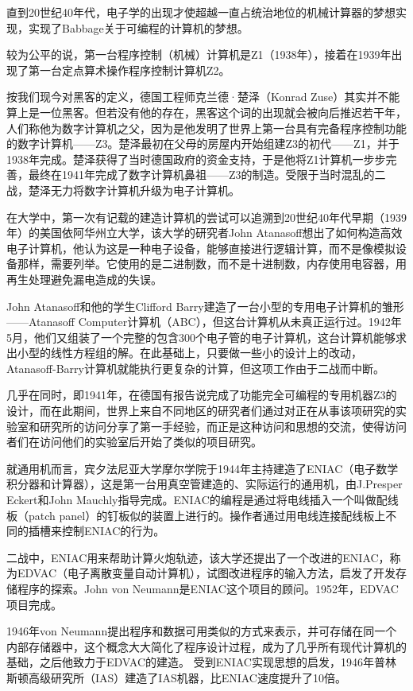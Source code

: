 直到20世纪40年代，电子学的出现才使超越一直占统治地位的机械计算器的梦想实现，实现了Babbage关于可编程的计算机的梦想。

较为公平的说，第一台程序控制（机械）计算机是Z1（1938年），接着在1939年出现了第一台定点算术操作程序控制计算机Z2。

按我们现今对黑客的定义，德国工程师克兰德·楚泽（Konrad Zuse）其实并不能算上是一位黑客。但若没有他的存在，黑客这个词的出现就会被向后推迟若干年，人们称他为数字计算机之父，因为是他发明了世界上第一台具有完备程序控制功能的数字计算机——Z3。楚泽最初在父母的房屋内开始组建Z3的初代——Z1，并于1938年完成。楚泽获得了当时德国政府的资金支持，于是他将Z1计算机一步步完善，最终在1941年完成了数字计算机鼻祖——Z3的制造。受限于当时混乱的二战，楚泽无力将数字计算机升级为电子计算机。

在大学中，第一次有记载的建造计算机的尝试可以追溯到20世纪40年代早期（1939年）的美国依阿华州立大学，该大学的研究者John Atanasoff想出了如何构造高效电子计算机，他认为这是一种电子设备，能够直接进行逻辑计算，而不是像模拟设备那样，需要列举。它使用的是二进制数，而不是十进制数，内存使用电容器，用再生处理避免漏电造成的失误。

John Atanasoff和他的学生Clifford Barry建造了一台小型的专用电子计算机的雏形——Atanasoff Computer计算机（ABC），但这台计算机从未真正运行过。1942年5月，他们又组装了一个完整的包含300个电子管的电子计算机，这台计算机能够求出小型的线性方程组的解。在此基础上，只要做一些小的设计上的改动，Atanasoff-Barry计算机就能执行更复杂的计算，但这项工作由于二战而中断。

几乎在同时，即1941年，在德国有报告说完成了功能完全可编程的专用机器Z3的设计，而在此期间，世界上来自不同地区的研究者们通过对正在从事该项研究的实验室和研究所的访问分享了第一手经验，而正是这种访问和思想的交流，使得访问者们在访问他们的实验室后开始了类似的项目研究。

就通用机而言，宾夕法尼亚大学摩尔学院于1944年主持建造了ENIAC（电子数学积分器和计算器），这是第一台用真空管建造的、实际运行的通用机，由J.Presper Eckert和John Mauchly指导完成。ENIAC的编程是通过将电线插入一个叫做配线板（patch panel）的钉板似的装置上进行的。操作者通过用电线连接配线板上不同的插槽来控制ENIAC的行为。

二战中，ENIAC用来帮助计算火炮轨迹，该大学还提出了一个改进的ENIAC，称为EDVAC（电子离散变量自动计算机），试图改进程序的输入方法，启发了开发存储程序的探索。John von Neumann是ENIAC这个项目的顾问。1952年，EDVAC项目完成。

1946年von Neumann提出程序和数据可用类似的方式来表示，并可存储在同一个内部存储器中，这个概念大大简化了程序设计过程，成为了几乎所有现代计算机的基础，之后他致力于EDVAC的建造。
受到ENIAC实现思想的启发，1946年普林斯顿高级研究所（IAS）建造了IAS机器，比ENIAC速度提升了10倍。

